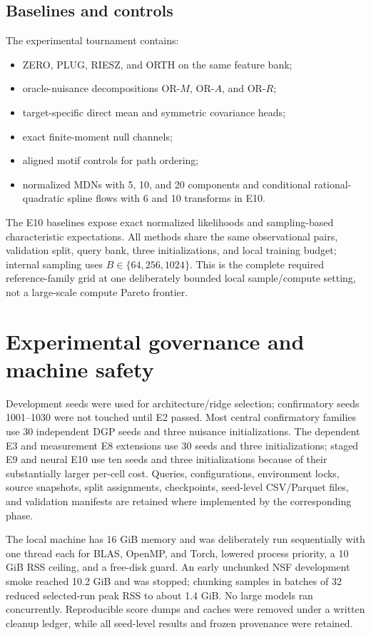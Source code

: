 \documentclass[11pt]{article}
\begin{document}
\subsection{Baselines and controls}

The experimental tournament contains:
\begin{itemize}
\item ZERO, PLUG, RIESZ, and ORTH on the same feature bank;
\item oracle-nuisance decompositions OR-$M$, OR-$A$, and OR-$R$;
\item target-specific direct mean and symmetric covariance heads;
\item exact finite-moment null channels;
\item aligned motif controls for path ordering;
\item normalized MDNs with 5, 10, and 20 components and conditional rational-quadratic spline flows with 6 and 10 transforms in E10.
\end{itemize}
The E10 baselines expose exact normalized likelihoods and sampling-based characteristic expectations.  All methods share the same observational pairs, validation split, query bank, three initializations, and local training budget; internal sampling uses $B\in\{64,256,1024\}$.  This is the complete required reference-family grid at one deliberately bounded local sample/compute setting, not a large-scale compute Pareto frontier.

\section{Experimental governance and machine safety}

Development seeds were used for architecture/ridge selection; confirmatory seeds 1001--1030 were not touched until E2 passed.  Most central confirmatory families use 30 independent DGP seeds and three nuisance initializations.  The dependent E3 and measurement E8 extensions use 30 seeds and three initializations; staged E9 and neural E10 use ten seeds and three initializations because of their substantially larger per-cell cost.  Queries, configurations, environment locks, source snapshots, split assignments, checkpoints, seed-level CSV/Parquet files, and validation manifests are retained where implemented by the corresponding phase.

The local machine has 16 GiB memory and was deliberately run sequentially with one thread each for BLAS, OpenMP, and Torch, lowered process priority, a 10 GiB RSS ceiling, and a free-disk guard.  An early unchunked NSF development smoke reached 10.2 GiB and was stopped; chunking samples in batches of 32 reduced selected-run peak RSS to about 1.4 GiB.  No large models ran concurrently.  Reproducible score dumps and caches were removed under a written cleanup ledger, while all seed-level results and frozen provenance were retained.
\end{document}
